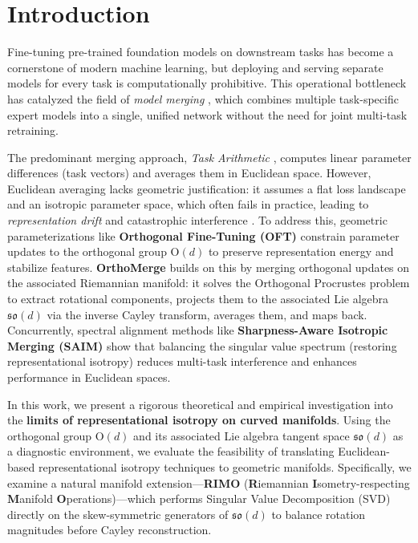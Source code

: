 \section{Introduction}
\label{sec:intro}

Fine-tuning pre-trained foundation models on downstream tasks has become a cornerstone of modern machine learning, but deploying and serving separate models for every task is computationally prohibitive. This operational bottleneck has catalyzed the field of \emph{model merging} \cite{ilharco2022editing, wortsman23}, which combines multiple task-specific expert models into a single, unified network without the need for joint multi-task retraining.

The predominant merging approach, \emph{Task Arithmetic} \cite{ilharco2022editing}, computes linear parameter differences (task vectors) and averages them in Euclidean space. However, Euclidean averaging lacks geometric justification: it assumes a flat loss landscape and an isotropic parameter space, which often fails in practice, leading to \emph{representation drift} and catastrophic interference \cite{ties2023, saim2026}. To address this, geometric parameterizations like \textbf{Orthogonal Fine-Tuning (OFT)} \cite{oft2023} constrain parameter updates to the orthogonal group $\mathrm{O}(d)$ to preserve representation energy and stabilize features. \textbf{OrthoMerge} \cite{yang2026orthomerge} builds on this by merging orthogonal updates on the associated Riemannian manifold: it solves the Orthogonal Procrustes problem to extract rotational components, projects them to the associated Lie algebra $\mathfrak{so}(d)$ via the inverse Cayley transform, averages them, and maps back. Concurrently, spectral alignment methods like \textbf{Sharpness-Aware Isotropic Merging (SAIM)} \cite{saim2026} show that balancing the singular value spectrum (restoring representational isotropy) reduces multi-task interference and enhances performance in Euclidean spaces.

In this work, we present a rigorous theoretical and empirical investigation into the \textbf{limits of representational isotropy on curved manifolds}. Using the orthogonal group $\mathrm{O}(d)$ and its associated Lie algebra tangent space $\mathfrak{so}(d)$ as a diagnostic environment, we evaluate the feasibility of translating Euclidean-based representational isotropy techniques to geometric manifolds. Specifically, we examine a natural manifold extension—\textbf{RIMO} (\textbf{R}iemannian \textbf{I}sometry-respecting \textbf{M}anifold \textbf{O}perations)—which performs Singular Value Decomposition (SVD) directly on the skew-symmetric generators of $\mathfrak{so}(d)$ to balance rotation magnitudes before Cayley reconstruction.

